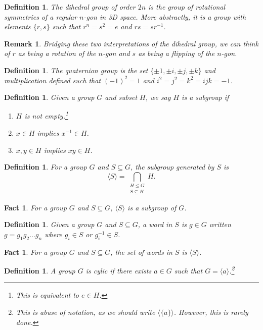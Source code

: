 \documentclass[a4paper,12pt]{article}
\theoremstyle{sltheorem}
\newtheorem{definition}[theorem]{Definition}
\newtheorem{remark}[theorem]{Remark}
\newtheorem{fact}[theorem]{Fact}
\begin{document}
\begin{definition}\label{dihedral_def}
    The \textit{dihedral group} of order $2n$ is the group of rotational symmetries of a regular $n$-gon in 3D space. More abstractly, it is a group with elements $\{r, s\}$ such that $r^n = s^2 = e$ and $rs = sr^{-1}$.
\end{definition}

\begin{remark}
Bridging these two interpretations of the dihedral group, we can think of $r$ as being a rotation of the $n$-gon and $s$ as being a flipping of the $n$-gon.
\end{remark}

\begin{definition}\label{quaternion_def}
The \textit{quaternion group} is the set $\{\pm 1, \pm i, \pm j, \pm k\}$ and multiplication defined such that ${(-1)}^2 = 1$ and $i^2 = j^2 = k^2 = ijk = -1$.
\end{definition}

\begin{definition}
    Given a group $G$ and subset $H$, we say $H$ is a \textit{subgroup} if 
    \begin{enumerate}
        \item $H$ is not empty.\footnote{This is equivalent to $e \in H$.}
        \item $x \in H$ implies $x^{-1} \in H$.
        \item $x, y \in H$ implies $xy \in H$. 
    \end{enumerate}
\end{definition}

\begin{definition}
    For a group $G$ and $S \subseteq G$, the subgroup \textit{generated} by $S$ is \[\langle S \rangle = \bigcap_{\substack{H \leq G \\ S \subseteq H}} H.\]
\end{definition}

\begin{fact}
    For a group $G$ and $S \subseteq G$, $\langle S \rangle$ is a subgroup of $G$.
\end{fact}

\begin{definition}\label{word_def}
    Given a group $G$ and $S \subseteq G$, a \textit{word} in $S$ is $g \in G$ written $g = g_1 g_2 \dots g_n$ where $g_i \in S$ or $g_i^{-1} \in S$. 
\end{definition}

\begin{fact}
    For a group $G$ and $S \subseteq G$, the set of words in $S$ is $\langle S \rangle$.
\end{fact}

\begin{definition}
    A group $G$ is cylic if there exists $a \in G$ such that $G = \langle a \rangle$.\footnote{This is abuse of notation, as we should write $\langle \{a\} \rangle$. However, this is rarely done.} 
\end{definition}
\end{document}
